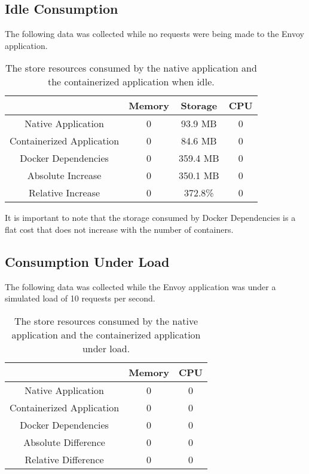 \documentclass{article}
\begin{document}
\subsection{Idle Consumption}
The following data was collected while no requests were being made to the Envoy application.

\begin{table}[h!]
\begin{tabular}{ |c|c|c|c| }
 \hline
   & Memory & Storage & CPU \\ 
 \hline
 Native Application & 0 & 93.9 MB & 0\\
 \hline
 Containerized Application & 0 & 84.6 MB & 0 \\
 \hline
 Docker Dependencies & 0 & 359.4 MB & 0 \\
 \hline\hline
 Absolute Increase & 0 & 350.1 MB & 0 \\
 \hline
 Relative Increase & 0 & 372.8\% & 0 \\
 \hline
\end{tabular}
\caption{The store resources consumed by the native application and the containerized application when idle.}
\label{table:1}
\end{table}

It is important to note that the storage consumed by Docker Dependencies is a flat cost that     does not increase with the number of containers.

\subsection{Consumption Under Load}
The following data was collected while the Envoy application was under a simulated load of 10 requests per second.

\begin{table}[h!]
\begin{tabular}{ |c|c|c| }
 \hline
   & Memory & CPU \\ 
 \hline
 Native Application & 0 & 0\\
 \hline
 Containerized Application & 0 & 0 \\
 \hline
 Docker Dependencies & 0 & 0 \\
 \hline\hline
 Absolute Difference & 0 & 0 \\
 \hline
 Relative Difference & 0 & 0 \\
 \hline
\end{tabular}
\caption{The store resources consumed by the native application and the containerized application under load.}
\label{table:2}
\end{table}
\end{document}

